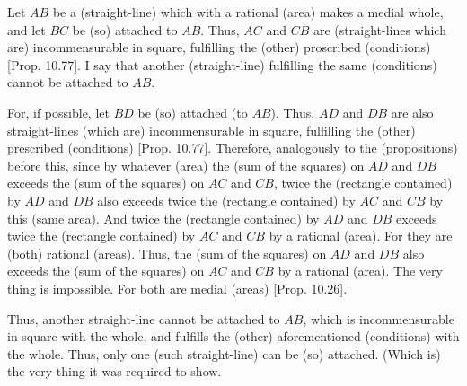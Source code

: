 \begin{Parallel}{}{}
{Let $AB$ be a (straight-line) which with a rational (area) makes a medial
whole,  and let $BC$ be (so) attached to $AB$. Thus, $AC$ and $CB$
are (straight-lines which are) incommensurable in square, fulfilling the (other) proscribed (conditions) [Prop. 10.77]. I say that another (straight-line)
fulfilling the same (conditions) cannot be attached to $AB$.

For, if possible, let $BD$ be (so) attached (to $AB$). Thus, $AD$ and
$DB$ are also straight-lines (which are) incommensurable in square,
fulfilling the (other) prescribed  (conditions) [Prop. 10.77]. Therefore, analogously to the
(propositions) before this, since by whatever (area)
the (sum of the squares) on $AD$ and $DB$ exceeds the (sum of the
squares) on $AC$ and $CB$,  twice the (rectangle contained)
by $AD$ and $DB$ also exceeds twice the (rectangle contained) by
$AC$ and $CB$ by this (same area). And twice the (rectangle contained) by $AD$ and
$DB$ exceeds twice the (rectangle contained) by $AC$ and
$CB$ by a rational (area). For they are (both) rational (areas).
Thus, the (sum of the squares) on 
$AD$ and $DB$ also exceeds the (sum of the squares) on $AC$ and $CB$
by a rational (area). The very thing is impossible. For both are
medial (areas) [Prop. 10.26].

 Thus, another
straight-line cannot be attached to $AB$, which is incommensurable
in square with the whole, and fulfills the (other) aforementioned (conditions) with the
whole. Thus, only one (such straight-line) can be (so) attached. (Which is)
the very thing it was required to show.}
\end{Parallel}


\vspace{7pt}{\footnotesize\noindent$^\dag$
This proposition is equivalent to Prop.~10.46, with minus signs instead of
plus signs.}

